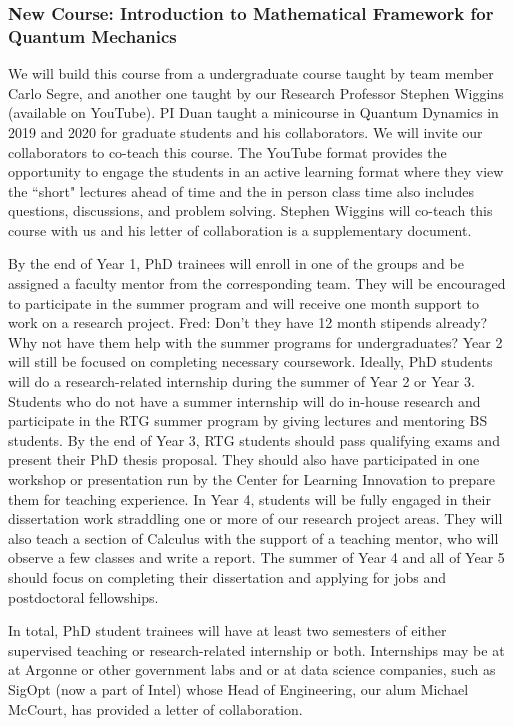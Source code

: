 \documentclass[11pt]{NSFamsart}
\newcommand{\FredNote}[1]{{\color{blue} Fred: #1}}
\begin{document}
\subsubsection*{New Course: Introduction to Mathematical Framework for Quantum Mechanics} We will build this course from  a   undergraduate course   taught by team member Carlo Segre, and another one taught by our Research Professor Stephen Wiggins (available on YouTube). PI Duan   taught a minicourse in Quantum Dynamics \cite{Gutzwiller1990ChaosIC, Holland1993TheQT,Lindgren2019QuantumMC,Micha2006QuantumDW} in 2019 and 2020 for graduate students and his collaborators.  We will invite our collaborators to co-teach this course. 
The YouTube format provides the opportunity to engage the students in an active learning format where they view the “short" lectures ahead of time and the in person class time  also includes  questions, discussions, and problem solving. Stephen Wiggins will co-teach this course with us and his letter of collaboration is a supplementary document.

By the end of Year 1, PhD trainees will enroll in one of the groups and be assigned a faculty mentor from the corresponding team. They will be encouraged to participate in the summer program and will receive one month support to work on a research project. \FredNote{Don't they have 12 month stipends already?  Why not have them help with the summer programs for undergraduates?} Year 2
will still be focused on completing necessary coursework.
Ideally, PhD students will do a research-related internship during the summer of Year 2 or Year 3. Students who do not have
a summer internship will do in-house research and participate in the RTG summer program
by giving lectures and mentoring BS students. By the end of Year 3, RTG students
should pass qualifying exams and present their PhD thesis proposal. They should also have participated in one   workshop or presentation run by the Center for Learning Innovation to prepare them for teaching experience. In Year 4, students will be fully engaged in their dissertation work straddling one or more of our research project areas. They will also teach a section of Calculus with the support of a teaching
mentor, who will observe a few classes and write a report. The summer of Year 4 and all of Year 5 should focus on completing their dissertation and applying for jobs and postdoctoral fellowships.

In total, PhD student trainees will have at least two semesters of either supervised teaching or research-related internship or both.  Internships may be at at Argonne or other government labs and or at data science companies, such as SigOpt (now a part of Intel) whose Head of Engineering, our alum Michael McCourt, has provided a letter  of collaboration.
\end{document}
